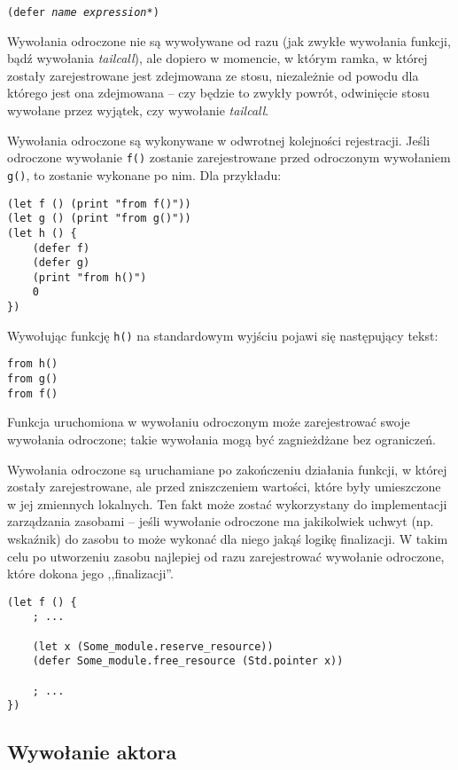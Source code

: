 \texttt{(defer \emph{name} \emph{expression}*)}
\newline

Wywołania odroczone nie są wywoływane od razu (jak zwykłe wywołania funkcji, bądź wywołania \emph{tailcall}),
ale dopiero w momencie, w którym ramka, w której zostały zarejestrowane jest zdejmowana ze stosu, niezależnie
od powodu dla którego jest ona zdejmowana -- czy będzie to zwykły powrót, odwinięcie stosu wywołane przez
wyjątek, czy wywołanie \emph{tailcall}.

Wywołania odroczone są wykonywane w odwrotnej kolejności rejestracji. Jeśli odroczone wywołanie \texttt{f()}
zostanie zarejestrowane przed odroczonym wywołaniem \texttt{g()}, to zostanie wykonane po nim. Dla przykładu:

\begin{lstlisting}
(let f () (print "from f()"))
(let g () (print "from g()"))
(let h () {
    (defer f)
    (defer g)
    (print "from h()")
    0
})
\end{lstlisting}

Wywołując funkcję \texttt{h()} na standardowym wyjściu pojawi się następujący tekst:

\begin{verbatim}
from h()
from g()
from f()
\end{verbatim}

Funkcja uruchomiona w wywołaniu odroczonym może zarejestrować swoje wywołania odroczone; takie wywołania
mogą być zagnieżdżane bez ograniczeń.

Wywołania odroczone są uruchamiane po zakończeniu działania funkcji, w której zostały zarejestrowane, ale
przed zniszczeniem wartości, które były umieszczone w jej zmiennych lokalnych. Ten fakt może zostać
wykorzystany do implementacji zarządzania zasobami -- jeśli wywołanie odroczone ma jakikolwiek uchwyt (np.
wskaźnik) do zasobu to może wykonać dla niego jakąś logikę finalizacji. W takim celu po utworzeniu zasobu
najlepiej od razu zarejestrować wywołanie odroczone, które dokona jego ,,finalizacji''.

\begin{lstlisting}
(let f () {
    ; ...

    (let x (Some_module.reserve_resource))
    (defer Some_module.free_resource (Std.pointer x))

    ; ...
})
\end{lstlisting}

\subsection{Wywołanie aktora}
\label{viuact_spec_actor_call}


